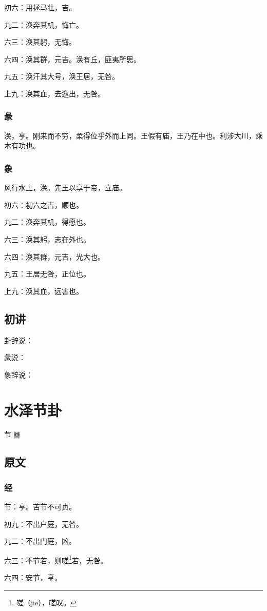 \documentclass[12pt,oneside]{book}
\begin{document}
初六：用拯马壮，吉。

九二：涣奔其机，悔亡。

六三：涣其躬，无悔。

六四：涣其群，元吉。涣有丘，匪夷所思。

九五：涣汗其大号，涣王居，无咎。

上九：涣其血，去逖出，无咎。

\subsection{彖}
涣，亨。刚来而不穷，柔得位乎外而上同。王假有庙，王乃在中也。利涉大川，乘木有功也。

\subsection{象}
风行水上，涣。先王以享于帝，立庙。

初六：初六之吉，顺也。

九二：涣奔其机，得愿也。

六三：涣其躬，志在外也。

六四：涣其群，元吉，光大也。

九五：王居无咎，正位也。

上九：涣其血，远害也。

\section{初讲}
卦辞说：

彖说：

象辞说：


\chapter{水泽节卦}
节 {\Large ䷻}


\section{原文}

\subsection{经}
节：亨。苦节不可贞。

初九：不出户庭，无咎。

九二：不出门庭，凶。

六三：不节若，则嗟\footnote{嗟（jiē），嗟叹。}若，无咎。

六四：安节，亨。
\end{document}
